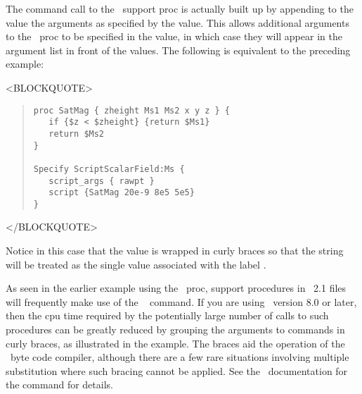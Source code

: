 The command call to the \Tcl\ support proc is actually built up by
appending to the  value the arguments as specified by the
 value.  This allows additional arguments to the
\Tcl\ proc to be specified in the  value, in which case
they will appear in the argument list in front of the
 values.  The following is equivalent to the
preceding example:
\begin{rawhtml}
<BLOCKQUOTE>
\end{rawhtml}
\begin{quote}
\begin{verbatim}
proc SatMag { zheight Ms1 Ms2 x y z } {
   if {$z < $zheight} {return $Ms1}
   return $Ms2
}

Specify ScriptScalarField:Ms {
   script_args { rawpt }
   script {SatMag 20e-9 8e5 5e5}
}
\end{verbatim}
\end{quote}
\begin{rawhtml}
</BLOCKQUOTE>
\end{rawhtml}
Notice in this case that the  value is wrapped in curly
braces so that the string  will be treated as
the single value associated with the label .

As seen in the earlier example using the  \Tcl\ proc,
support procedures in \MIF~2.1 files will frequently make use of the
\Tcl\  command.  If you are using \Tcl\ version 8.0 or later,
then the cpu time required by the potentially large number of calls to
such procedures can be greatly reduced by grouping the arguments to
 commands in curly braces, as illustrated in the
 example.  The braces aid the operation of the \Tcl\
byte code compiler, although there are a few rare situations involving
multiple substitution where such bracing cannot be applied.  See the
\Tcl\ documentation for the \cd{expr} command for details.


